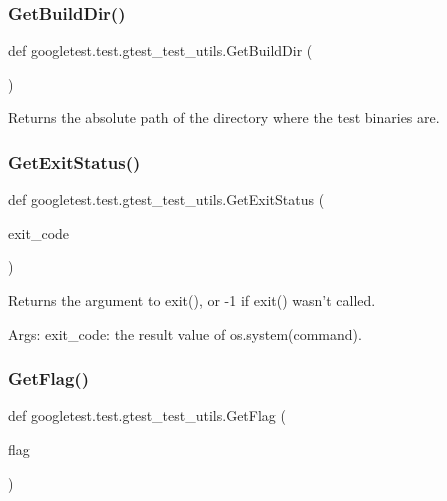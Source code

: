 \subsubsection{\texorpdfstring{GetBuildDir()}{GetBuildDir()}}
{\footnotesize\ttfamily def googletest.\+test.\+gtest\+\_\+test\+\_\+utils.\+Get\+Build\+Dir (\begin{DoxyParamCaption}{ }\end{DoxyParamCaption})}

\begin{DoxyVerb}Returns the absolute path of the directory where the test binaries are.\end{DoxyVerb}
 \mbox{\label{namespacegoogletest_1_1test_1_1gtest__test__utils_a77ff78f9754a6c7238a7d53e5b7769dd}} 
\subsubsection{\texorpdfstring{GetExitStatus()}{GetExitStatus()}}
{\footnotesize\ttfamily def googletest.\+test.\+gtest\+\_\+test\+\_\+utils.\+Get\+Exit\+Status (\begin{DoxyParamCaption}\item[{}]{exit\+\_\+code }\end{DoxyParamCaption})}

\begin{DoxyVerb}Returns the argument to exit(), or -1 if exit() wasn't called.

Args:
  exit_code: the result value of os.system(command).
\end{DoxyVerb}
 \mbox{\label{namespacegoogletest_1_1test_1_1gtest__test__utils_a5fbeb1d0ff8d238ae1717ea9b9fb8e36}} 
\subsubsection{\texorpdfstring{GetFlag()}{GetFlag()}}
{\footnotesize\ttfamily def googletest.\+test.\+gtest\+\_\+test\+\_\+utils.\+Get\+Flag (\begin{DoxyParamCaption}\item[{}]{flag }\end{DoxyParamCaption})}

